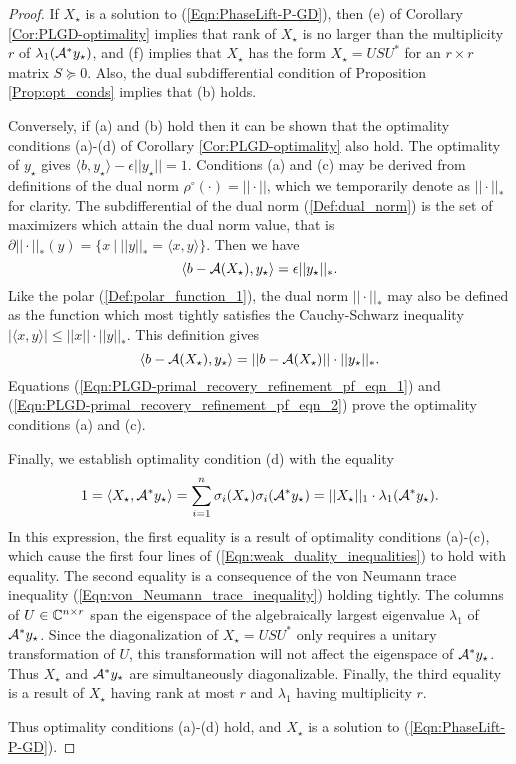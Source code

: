 \begin{proof}
If $X_\star$ is a solution to (\ref{Eqn:PhaseLift-P-GD}), then (e) of Corollary \ref{Cor:PLGD-optimality} implies that rank of $X_\star$ is no larger than the multiplicity $r$ of $\lambda_1({\mathcal A}^*y_\star)$, and (f) implies that $X_\star$ has the form $X_\star = USU^*$ for an $r \times r$ matrix $S \succeq 0$.  Also, the dual subdifferential condition of Proposition \ref{Prop:opt_conds} implies that (b) holds.

Conversely, if (a) and (b) hold then it can be shown that the optimality conditions (a)-(d) of Corollary \ref{Cor:PLGD-optimality} also hold.  The optimality of $y_\star$ gives $\langle b, y_\star \rangle - \epsilon ||y_\star|| = 1$.  
Conditions (a) and (c) may be derived from definitions of the dual norm $\rho^\circ(\cdot) = ||\cdot||$, which we temporarily denote as $||\cdot||_*$ for clarity. 
The subdifferential of the dual norm (\ref{Def:dual_norm}) is the set of maximizers which attain the dual norm value, that is $\partial || \cdot ||_* (y) = \{ x \ | \ ||y||_* = \langle x,y \rangle \}$.  
Then we have
\begin{equation}			\label{Eqn:PLGD-primal_recovery_refinement_pf_eqn_1}
\langle b - {\mathcal A}(X_\star), y_\star \rangle = \epsilon ||y_\star||_*.
\end{equation}
Like the polar (\ref{Def:polar_function_1}), the dual norm $||\cdot||_*$ may also be defined as the function which most tightly satisfies the Cauchy-Schwarz inequality $|\langle x, y \rangle| \leq ||x|| \cdot ||y||_*$.  This definition gives
\begin{equation}			\label{Eqn:PLGD-primal_recovery_refinement_pf_eqn_2}
\langle b - {\mathcal A}(X_\star), y_\star \rangle = ||b-{\mathcal A}(X_\star)|| \cdot ||y_\star||_*.
\end{equation} 
Equations (\ref{Eqn:PLGD-primal_recovery_refinement_pf_eqn_1}) and (\ref{Eqn:PLGD-primal_recovery_refinement_pf_eqn_2}) prove the optimality conditions (a) and (c).

Finally, we establish optimality condition (d) with the equality
\[
1 = \langle X_\star, {\mathcal A}^*y_\star \rangle = \sum_{i=1}^n \sigma_i(X_\star) \sigma_i({\mathcal A}^*y_\star) = ||X_\star||_1 \cdot \lambda_1({\mathcal A}^*y_\star).
\]
In this expression, the first equality is a result of optimality conditions (a)-(c), which cause the first four lines of (\ref{Eqn:weak_duality_inequalities}) to hold with equality.  
The second equality is a consequence of the von Neumann trace inequality (\ref{Eqn:von_Neumann_trace_inequality}) holding tightly.  The columns of $U \in {\mathbb C}^{n \times r}$ span the eigenspace of the algebraically largest eigenvalue $\lambda_1$ of ${\mathcal A}^*y_\star$.  
Since the diagonalization of $X_\star = USU^*$ only requires a unitary transformation of $U$, this transformation will not affect the eigenspace of ${\mathcal A}^*y_\star$.  
Thus $X_\star$ and ${\mathcal A}^*y_\star$ are simultaneously diagonalizable.  Finally, the third equality is a result of $X_\star$ having rank at most $r$ and $\lambda_1$ having multiplicity $r$.

Thus optimality conditions (a)-(d) hold, and  $X_\star$ is a solution to (\ref{Eqn:PhaseLift-P-GD}).


\end{proof}

